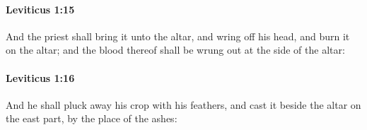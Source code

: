 		\paragraph{Leviticus 1:15} %
			\label{LEVITICUS-1-15}

			And the priest shall bring it unto the altar, and wring off his head, and burn it on the altar; and the blood thereof shall be wrung out at the side of the altar:


		\paragraph{Leviticus 1:16} %
			\label{LEVITICUS-1-16}

			And he shall pluck away his crop with his feathers, and cast it beside the altar on the east part, by the place of the ashes:



